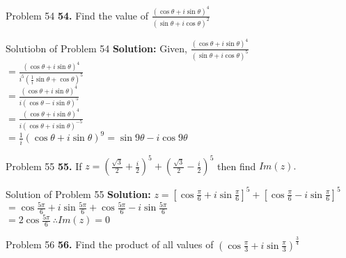 \documentclass[aspectratio=169,8pt]{beamer}
\begin{document}
\begin{frame}{Problem 54}
  \textbf{54.} Find the value of $\frac{(\cos\theta + i\sin\theta)^4}{(\sin\theta + i\cos\theta)^2}$
\end{frame}
\begin{frame}{Solutiobn of Problem 54}
  \textbf{Solution:} Given, $\frac{(\cos\theta + i\sin\theta)^4}{(\sin\theta + i\cos\theta)^5}$\\
  \vspace*{0.2cm}
  $= \frac{(\cos\theta + i\sin\theta)^4}{i^5\left(\frac{1}{i}\sin\theta + \cos\theta\right)^5}$\\
  \vspace*{0.2cm}
  $= \frac{(\cos\theta + i\sin\theta)^4}{i(\cos\theta - i\sin\theta)^5}$\\
  \vspace*{0.2cm}
  $= \frac{(\cos\theta + i\sin\theta)^4}{i(\cos\theta + i\sin\theta)^{-5}}$\\
  \vspace*{0.2cm}
  $= \frac{1}{i}(\cos\theta + i\sin\theta)^9 = \sin9\theta -i \cos9\theta$
\end{frame}
\begin{frame}{Problem 55}
  \textbf{55.} If $z = \left(\frac{\sqrt{3}}{2}+ \frac{i}{2}\right)^5 + \left(\frac{\sqrt{3}}{2} - \frac{i}{2}\right)^5$ then find $Im(z).$
\end{frame}
\begin{frame}{Solution of Problem 55}
  \textbf{Solution:} $z = \left[\cos\frac{\pi}{6} + i\sin\frac{\pi}{6}\right]^5 + \left[\cos\frac{\pi}{6} - i\sin\frac{\pi}{6}\right]^5$\\
  \vspace*{0.2cm}
  $= \cos\frac{5\pi}{6} + i\sin\frac{5\pi}{6} + \cos\frac{5\pi}{6} - i\sin\frac{5\pi}{6}$\\
  \vspace*{0.2cm}
  $= 2\cos\frac{5\pi}{6}~\therefore Im(z) = 0$
\end{frame}
\begin{frame}{Problem 56}
  \textbf{56.} Find the product of all values of $\left(\cos\frac{\pi}{3} + i\sin\frac{\pi}{3}\right)^{\frac{3}{4}}$
\end{frame}
\end{document}
